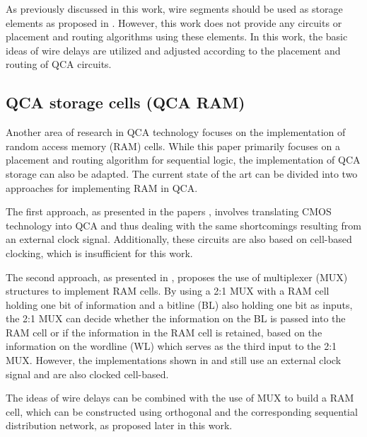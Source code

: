 As previously discussed in this work, wire segments should be used as storage elements as proposed in \cite{Walter}. However, this work does not provide any circuits or placement and routing algorithms using these elements. In this work, the basic ideas of wire delays are utilized and adjusted according to the placement and routing of QCA circuits.

\subsection{QCA storage cells (QCA RAM)}\label{subsec:RAM_SoA}
Another area of research in QCA technology focuses on the implementation of random access memory (RAM) cells. While this paper primarily focuses on a placement and routing algorithm for sequential logic, the implementation of QCA storage can also be adapted. The current state of the art can be divided into two approaches for implementing RAM in QCA.

The first approach, as presented in the papers \cite{RAM_overview, crosstalk, RAM_cell}, involves translating CMOS technology into QCA and thus dealing with the same shortcomings resulting from an external clock signal. Additionally, these circuits are also based on cell-based clocking, which is insufficient for this work.

The second approach, as presented in \cite{ahmad2018optimal, majeed2019optimal}, proposes the use of multiplexer (MUX) structures to implement RAM cells. By using a 2:1 MUX with a RAM cell holding one bit of information and a bitline (BL) also holding one bit as inputs, the 2:1 MUX can decide whether the information on the BL is passed into the RAM cell or if the information in the RAM cell is retained, based on the information on the wordline (WL) which serves as the third input to the 2:1 MUX. However, the implementations shown in \cite{ahmad2018optimal} and \cite{majeed2019optimal} still use an external clock signal and are also clocked cell-based.

The ideas of wire delays can be combined with the use of MUX to build a RAM cell, which can be constructed using orthogonal and the corresponding sequential distribution network, as proposed later in this work.
